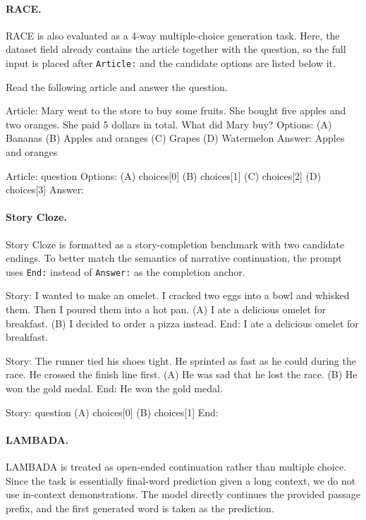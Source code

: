 \paragraph{RACE.}
RACE is also evaluated as a 4-way multiple-choice generation task. Here, the dataset field already contains the article together with the question, so the full input is placed after \texttt{Article:} and the candidate options are listed below it.

\begin{promptbox}
Read the following article and answer the question.

Article: Mary went to the store to buy some fruits. She bought five apples and two oranges. She paid 5 dollars in total. What did Mary buy?
Options:
(A) Bananas
(B) Apples and oranges
(C) Grapes
(D) Watermelon
Answer: Apples and oranges

Article: {question}
Options:
(A) {choices[0]}
(B) {choices[1]}
(C) {choices[2]}
(D) {choices[3]}
Answer:
\end{promptbox}

\paragraph{Story Cloze.}
Story Cloze is formatted as a story-completion benchmark with two candidate endings. To better match the semantics of narrative continuation, the prompt uses \texttt{End:} instead of \texttt{Answer:} as the completion anchor.

\begin{promptbox}
Story: I wanted to make an omelet. I cracked two eggs into a bowl and whisked them. Then I poured them into a hot pan.
(A) I ate a delicious omelet for breakfast.
(B) I decided to order a pizza instead.
End: I ate a delicious omelet for breakfast.

Story: The runner tied his shoes tight. He sprinted as fast as he could during the race. He crossed the finish line first.
(A) He was sad that he lost the race.
(B) He won the gold medal.
End: He won the gold medal.

Story: {question}
(A) {choices[0]}
(B) {choices[1]}
End:
\end{promptbox}

\paragraph{LAMBADA.}
LAMBADA is treated as open-ended continuation rather than multiple choice. Since the task is essentially final-word prediction given a long context, we do not use in-context demonstrations. The model directly continues the provided passage prefix, and the first generated word is taken as the prediction.

